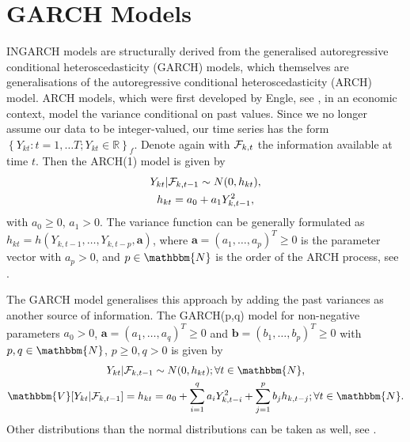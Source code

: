 
\section{GARCH Models}
\label{sec: Garch Models}

INGARCH models are structurally derived from the generalised autoregressive conditional heteroscedasticity (GARCH) models, which themselves are generalisations of the autoregressive conditional heteroscedasticity (ARCH) model. ARCH models, which were first developed by Engle, see \textcite{Engle:1982}, in an economic context, model the variance conditional on past values. Since we no longer assume our data to be integer-valued, our time series has the form $\left\{Y_{kt}:t=1,\ldots T; Y_{kt} \in \mathbb{R}\right\}_f$. Denote again with $\mathcal{F}_{k,t}$ the information available at time $t$. Then the ARCH(1) model is given by 
\begin{equation}
\begin{gathered}
Y_{kt} | \mathcal{F}_{k,t-1} \sim N(0,h_{kt}),\\
h_{kt} = a_0 + a_1 Y_{k,t-1}^2,
\label{eq:ARCH model}
\end{gathered}
\end{equation}
%
with $a_0\geq0$, $a_1>0$. The variance function can be generally formulated as $h_{kt} = h(Y_{k,t-1},\ldots,Y_{k,t-p},\bm{a})$, where $\bm{a}=(a_1,\ldots,a_p)^T\geq 0$ is the parameter vector with $a_p>0$, and $p \in \mathbbm{N}$ is the order of the ARCH process, see \textcite{Engle:1982}. 

The GARCH model generalises this approach by adding the past variances as another source of information. The GARCH(p,q) model for non-negative parameters $a_0>0$, $\bm{a}=(a_1,\ldots,a_q)^T\geq 0$ and $\bm{b}=(b_1,\ldots,b_p)^T\geq0$ with $p,q \in \mathbbm{N}$, $p\geq0, q>0$ is given by 
\begin{equation}
\begin{gathered}
Y_{kt} | \SigA_{k,t-1} \sim N(0,h_{kt}); \forall t \in \mathbbm{N}, \\
\mathbbm{V}[Y_{kt}|\SigA_{k,t-1}]=h_{kt} = a_0 + \sum_{i=1}^q a_i Y_{k,t-i}^2 + \sum_{j=1}^p b_j h_{k,t-j};\forall t \in \mathbbm{N}.
\label{eq:GARCH model}
\end{gathered}
\end{equation}
%
Other distributions than the normal distributions can be taken as well, see \textcite{Bollerslev:1986}. 

